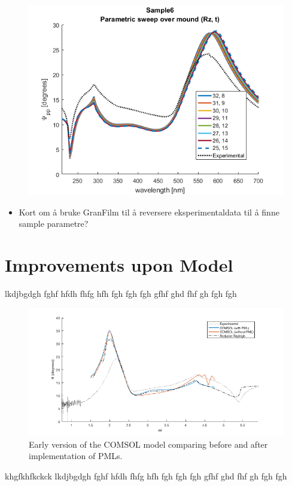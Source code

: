 \begin{figure}[h!]
    \centering
    \includegraphics[width=0.8\linewidth]{figures/Appendix/parameters/Sample6_Psipp_varying_Rz_and_t_mound_parameters.png}
\end{figure}

\begin{itemize}
    \item Kort om å bruke GranFilm til å reversere eksperimentaldata til å finne sample parametre?
\end{itemize}

\section{Improvements upon Model}
lkdjbgdgh  fghf hfdh fhfg hfh fgh fgh fgh
gfhf ghd fhf gh fgh fgh 
\begin{figure}
    \centering
    \includegraphics[scale=0.5]{figures/Appendix/Psi_ComsolPMLvsJPvsUserports.png}
    \caption{Early version of the COMSOL model comparing before and after implementation of PMLs.}
    \label{fig:Appendix_PMLvsnoPML}
\end{figure}
khgfkhfkckck lkdjbgdgh  fghf hfdh fhfg hfh fgh fgh fgh
gfhf ghd fhf gh fgh fgh 

